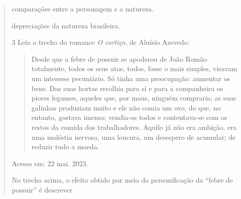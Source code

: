 \begin{quote}
{\begin{escolha}
  \item comparações entre a personagem e a natureza.

  \item depreciações da natureza brasileira.

\end{escolha}


\num{3} Leia o trecho do romance \textit{O cortiço}, de Aluísio Azevedo:



\begin{quote}

Desde que a febre de possuir se apoderou de João Romão totalmente, todos os seus atos, todos, 
fosse o mais simples, visavam um interesse pecuniário. Só tinha uma preocupação: aumentar 
os bens. Das suas hortas recolhia para si e para a companheira os piores legumes, aqueles que,
por maus, ninguém compraria; as suas galinhas produziam muito e ele não comia um ovo, do que, 
no entanto, gostava imenso; vendia-os todos e contentava-se com os restos da comida dos 
trabalhadores. Aquilo já não era ambição, era uma moléstia nervosa, uma loucura, um desespero
de acumular; de reduzir tudo a moeda.

\end{quote}

Acesso em: 22 mai. 2023.}

No trecho acima, o efeito obtido por meio da personificação da ``febre de possuir'' é descrever


\end{quote}
